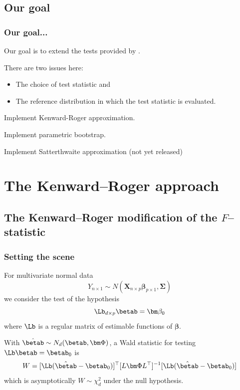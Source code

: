 \subsection{Our goal}
\label{sec:our-goal}

\begin{sframe}
\frametitle{Our goal...}
Our goal is to extend the tests provided by \lmer.

There are two issues here:

\begin{itemize}
\item  The choice of test statistic and
  
\item  The reference distribution in which the test statistic is evaluated.
  
\end{itemize}

Implement Kenward-Roger approximation.

Implement parametric bootstrap.

Implement Satterthwaite approximation (not yet released)

\end{sframe}




\section{The Kenward--Roger approach}

\subsection{The Kenward--Roger modification of the $F$--statistic}

\def\transp{^{\top}}
\def\inv{^{-1}}


\begin{sframe}
\frametitle{Setting the scene}
For multivariate normal data
\[
  Y_{n\times 1} \sim  N(\bm X_{n\times p} \bm \beta_{p\times 1}, \bm \Sigma)
\]
we consider the test of the hypothesis
\[
  \Lb_{d \times p} \betab = \bm \beta_0
\]
where $\Lb$ is a regular matrix of estimable functions of $\bm \beta$.

With $\hat \betab \sim N_d(\betab, \bm\Phi)$, a Wald statistic for testing $\Lb \betab = \betab_0$ is
\begin{displaymath}
  W = [\Lb(\hat\betab - \betab_0)]\transp [L\bm\Phi L\transp]\inv [\Lb(\hat\betab - \betab_0)]
\end{displaymath}
which is asymptotically $W \sim \chi^2_d$ under the null hypothesis. 
\end{sframe}

